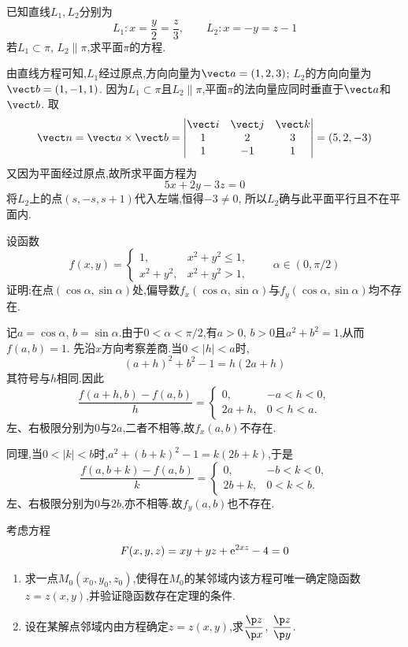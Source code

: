 \documentclass{ctexart}
\begin{document}
\begin{problem}[3.]
已知直线$L_1,L_2$分别为
\[L_1:x=\dfrac y2=\dfrac z3,\qquad L_2:x=-y=z-1\]
若$L_1\subset\pi$, $L_2\parallel\pi$,求平面$\pi$的方程.
\end{problem}
\begin{solution}
由直线方程可知,$L_1$经过原点,方向向量为$\vect a=(1,2,3)$;
$L_2$的方向向量为$\vect b=(1,-1,1)$.
因为$L_1\subset\pi$且$L_2\parallel\pi$,平面$\pi$的法向量应同时垂直于$\vect a$和$\vect b$.
取
\[\vect n=\vect a\times\vect b=
\begin{vmatrix}
\vect i&\vect j&\vect k\\
1&2&3\\
1&-1&1
\end{vmatrix}=(5,2,-3)\]
又因为平面经过原点,故所求平面方程为
\[5x+2y-3z=0\]
将$L_2$上的点$(s,-s,s+1)$代入左端,恒得$-3\ne0$,
所以$L_2$确与此平面平行且不在平面内.
\end{solution}
\begin{problem}[4.]
设函数
\[f(x,y)=\begin{cases}1,&x^2+y^2\leqslant1,\\x^2+y^2,&x^2+y^2>1,\end{cases}\qquad \alpha\in(0,\pi/2)\]
证明:在点$(\cos\alpha,\sin\alpha)$处,偏导数$f_x(\cos\alpha,\sin\alpha)$与$f_y(\cos\alpha,\sin\alpha)$均不存在.
\end{problem}
\begin{solution}
记$a=\cos\alpha$, $b=\sin\alpha$.由于$0<\alpha<\pi/2$,有$a>0$, $b>0$且$a^2+b^2=1$,从而$f(a,b)=1$.
先沿$x$方向考察差商.当$0<|h|<a$时,
\[(a+h)^2+b^2-1=h(2a+h)\]
其符号与$h$相同.因此
\[\dfrac{f(a+h,b)-f(a,b)}h=
\begin{cases}
0,&-a<h<0,\\
2a+h,&0<h<a.
\end{cases}\]
左、右极限分别为$0$与$2a$,二者不相等,故$f_x(a,b)$不存在.

同理,当$0<|k|<b$时,$a^2+(b+k)^2-1=k(2b+k)$,于是
\[\dfrac{f(a,b+k)-f(a,b)}k=
\begin{cases}
0,&-b<k<0,\\
2b+k,&0<k<b.
\end{cases}\]
左、右极限分别为$0$与$2b$,亦不相等.故$f_y(a,b)$也不存在.
\end{solution}
\begin{problem}[5.]
考虑方程
\[F(x,y,z)=xy+yz+\mathrm{e}^{2xz}-4=0\]
\begin{enumerate}[label=\tbf{(\alph*)},leftmargin=*,topsep=0pt,parsep=0pt,itemsep=0pt,partopsep=0pt]
\item 求一点$M_0(x_0,y_0,z_0)$,使得在$M_0$的某邻域内该方程可唯一确定隐函数$z=z(x,y)$,并验证隐函数存在定理的条件.
\item 设在某解点邻域内由方程确定$z=z(x,y)$,求$\dfrac{\p z}{\p x}$, $\dfrac{\p z}{\p y}$.
\end{enumerate}
\end{problem}
\end{document}
